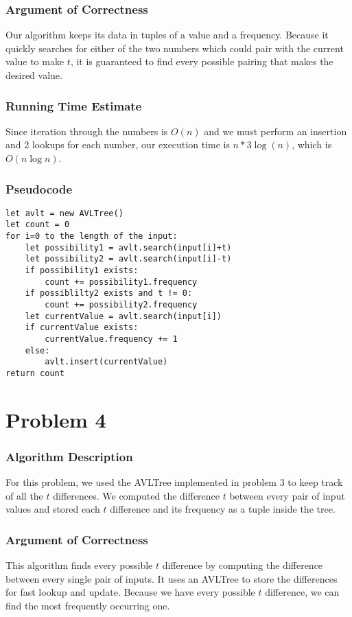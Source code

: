 \documentclass[letterpaper, 12pt]{math}
\begin{document}
\subsubsection*{Argument of Correctness}
Our algorithm keeps its data in tuples of a value and a frequency. Because it
quickly searches for either of the two numbers which could pair with the
current value to make \( t \), it is guaranteed to find every possible pairing
that makes the desired value.

\subsubsection*{Running Time Estimate} Since iteration through the numbers is
\( O(n) \) and we must perform an insertion and 2 lookups for each number, our
execution time is \( n*3\log(n) \), which is \( O(n\log n) \).

\subsubsection*{Pseudocode}
\begin{lstlisting}
let avlt = new AVLTree()
let count = 0
for i=0 to the length of the input:
    let possibility1 = avlt.search(input[i]+t)
    let possibility2 = avlt.search(input[i]-t)
    if possibility1 exists:
        count += possibility1.frequency
    if possiblilty2 exists and t != 0:
        count += possibility2.frequency
    let currentValue = avlt.search(input[i])
    if currentValue exists:
        currentValue.frequency += 1
    else:
        avlt.insert(currentValue)
return count
\end{lstlisting}

\section*{Problem 4}

\subsubsection*{Algorithm Description}
For this problem, we used the AVLTree implemented in problem 3 to keep track
of all the \( t \) differences. We computed the difference \( t \) between every
pair of input values and stored each \( t \) difference and its frequency as
a tuple inside the tree.

\subsubsection*{Argument of Correctness}
This algorithm finds every possible \( t \) difference by computing the
difference between every single pair of inputs. It uses an AVLTree to store the
differences for fast lookup and update. Because we have every possible \( t \)
difference, we can find the most frequently occurring one.
\end{document}
